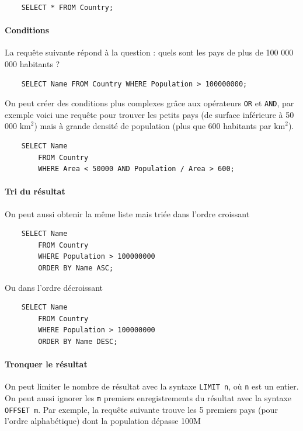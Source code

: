 \begin{verbatim}
    SELECT * FROM Country;
\end{verbatim}

\paragraph*{Conditions} La requête suivante répond à la question : quels sont les pays de plus de 100 000 000 habitants ?

\begin{verbatim}
    SELECT Name FROM Country WHERE Population > 100000000;
\end{verbatim}

On peut créer des conditions plus complexes grâce aux opérateurs \texttt{OR} et \texttt{AND}, par exemple voici une requête pour trouver les petits pays (de surface inférieure à 50 000 $ \textrm{km}^2 $) mais à grande densité de population (plus que 600 habitants par $ \textrm{km}^2 $).

\begin{verbatim}
    SELECT Name
        FROM Country
        WHERE Area < 50000 AND Population / Area > 600;
\end{verbatim}


\paragraph*{Tri du résultat} On peut aussi obtenir la même liste mais triée dans l'ordre croissant

\begin{verbatim}
    SELECT Name 
        FROM Country 
        WHERE Population > 100000000 
        ORDER BY Name ASC;
\end{verbatim}

Ou dans l'ordre décroissant

\begin{verbatim}
    SELECT Name 
        FROM Country 
        WHERE Population > 100000000 
        ORDER BY Name DESC;
\end{verbatim}

\paragraph*{Tronquer le résultat} On peut limiter le nombre de résultat avec la syntaxe \texttt{LIMIT n}, où \texttt{n} est un entier. On peut aussi ignorer les \texttt{m} premiers enregistrements du résultat avec la syntaxe \texttt{OFFSET m}. Par exemple, la requête suivante trouve les 5 premiers pays (pour l'ordre alphabétique) dont la population dépasse 100M

